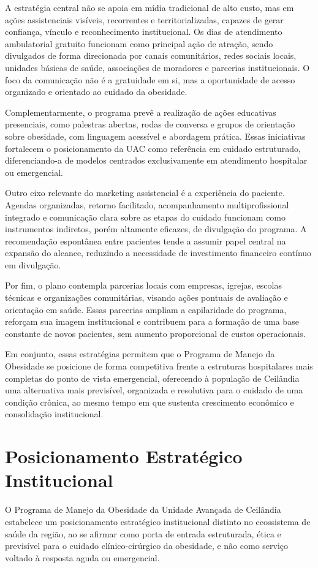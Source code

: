 \documentclass[12pt]{article}
\begin{document}
A estratégia central não se apoia em mídia tradicional de alto custo, mas em ações assistenciais visíveis, recorrentes e territorializadas, capazes de gerar confiança, vínculo e reconhecimento institucional. Os dias de atendimento ambulatorial gratuito funcionam como principal ação de atração, sendo divulgados de forma direcionada por canais comunitários, redes sociais locais, unidades básicas de saúde, associações de moradores e parcerias institucionais. O foco da comunicação não é a gratuidade em si, mas a oportunidade de acesso organizado e orientado ao cuidado da obesidade.

Complementarmente, o programa prevê a realização de ações educativas presenciais, como palestras abertas, rodas de conversa e grupos de orientação sobre obesidade, com linguagem acessível e abordagem prática. Essas iniciativas fortalecem o posicionamento da UAC como referência em cuidado estruturado, diferenciando-a de modelos centrados exclusivamente em atendimento hospitalar ou emergencial.

Outro eixo relevante do marketing assistencial é a experiência do paciente. Agendas organizadas, retorno facilitado, acompanhamento multiprofissional integrado e comunicação clara sobre as etapas do cuidado funcionam como instrumentos indiretos, porém altamente eficazes, de divulgação do programa. A recomendação espontânea entre pacientes tende a assumir papel central na expansão do alcance, reduzindo a necessidade de investimento financeiro contínuo em divulgação.

Por fim, o plano contempla parcerias locais com empresas, igrejas, escolas técnicas e organizações comunitárias, visando ações pontuais de avaliação e orientação em saúde. Essas parcerias ampliam a capilaridade do programa, reforçam sua imagem institucional e contribuem para a formação de uma base constante de novos pacientes, sem aumento proporcional de custos operacionais.

Em conjunto, essas estratégias permitem que o Programa de Manejo da Obesidade se posicione de forma competitiva frente a estruturas hospitalares mais completas do ponto de vista emergencial, oferecendo à população de Ceilândia uma alternativa mais previsível, organizada e resolutiva para o cuidado de uma condição crônica, ao mesmo tempo em que sustenta crescimento econômico e consolidação institucional.

\FGVNewPage

\section{Posicionamento Estratégico Institucional}
\label{sec:org54d6d34}
O Programa de Manejo da Obesidade da Unidade Avançada de Ceilândia estabelece um posicionamento estratégico institucional distinto no ecossistema de saúde da região, ao se afirmar como porta de entrada estruturada, ética e previsível para o cuidado clínico-cirúrgico da obesidade, e não como serviço voltado à resposta aguda ou emergencial.
\end{document}
